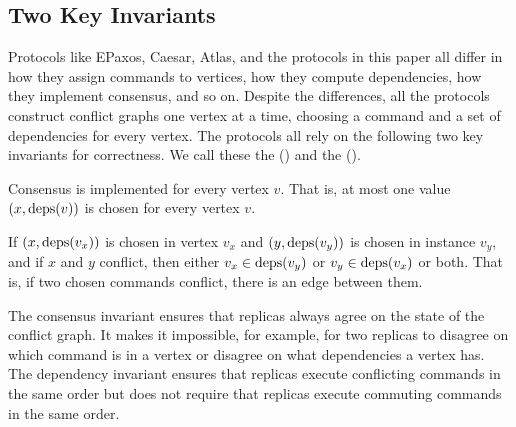 \subsection{Two Key Invariants}
Protocols like EPaxos, Caesar, Atlas, and the \BPaxos{} protocols in this paper
all differ in how they assign commands to vertices, how they compute
dependencies, how they implement consensus, and so on. Despite the differences,
all the protocols construct conflict graphs one vertex at a time, choosing a
command and a set of dependencies for every vertex. The protocols all rely on
the following two key invariants for correctness. We call these the
 () and the
 ().

\begin{invariant}
  Consensus is implemented for every vertex $v$. That is, at most one value
  $(x, \text{deps}(v))$ is chosen for every vertex $v$.
\end{invariant}%

\begin{invariant}
  If $(x, \text{deps}(v_x))$ is chosen in vertex $v_x$ and $(y, \text{deps}(v_y))$ is
  chosen in instance $v_y$, and if $x$ and $y$ conflict, then either $v_x \in
  \text{deps}(v_y)$ or $v_y \in \text{deps}(v_x)$ or both. That is, if two chosen commands
  conflict, there is an edge between them.
\end{invariant}

The consensus invariant ensures that replicas always agree on the state of the
conflict graph. It makes it impossible, for example, for two replicas to
disagree on which command is in a vertex or disagree on what dependencies a
vertex has. The dependency invariant ensures that replicas execute conflicting
commands in the same order but does not require that replicas execute commuting
commands in the same order.
